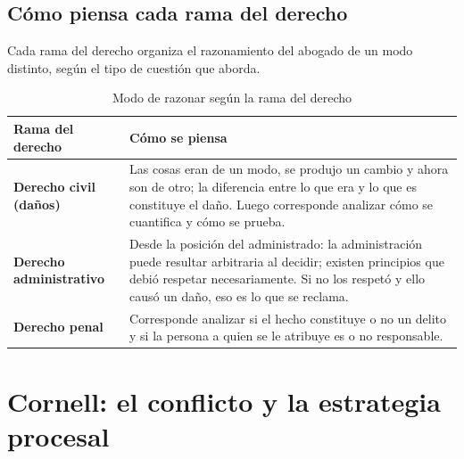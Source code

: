 \documentclass[12pt,oneside]{book}
\begin{document}
\subsection{Cómo piensa cada rama del derecho}

Cada rama del derecho organiza el razonamiento del abogado de un modo distinto, según el tipo de cuestión que aborda.

\begin{table}[H]
\centering
\caption{Modo de razonar según la rama del derecho}
\begin{tabularx}{\textwidth}{>{\raggedright\arraybackslash}p{} X}
\toprule
\textbf{Rama del derecho} & \textbf{Cómo se piensa} \\
\midrule
\textbf{Derecho civil (daños)} & Las cosas eran de un modo, se produjo un cambio y ahora son de otro; la diferencia entre lo que era y lo que es constituye el daño. Luego corresponde analizar cómo se cuantifica y cómo se prueba. \\
\textbf{Derecho administrativo} & Desde la posición del administrado: la administración puede resultar arbitraria al decidir; existen principios que debió respetar necesariamente. Si no los respetó y ello causó un daño, eso es lo que se reclama. \\
\textbf{Derecho penal} & Corresponde analizar si el hecho constituye o no un delito y si la persona a quien se le atribuye es o no responsable. \\
\bottomrule
\end{tabularx}
\end{table}

\section*{Cornell: el conflicto y la estrategia procesal}
\end{document}
